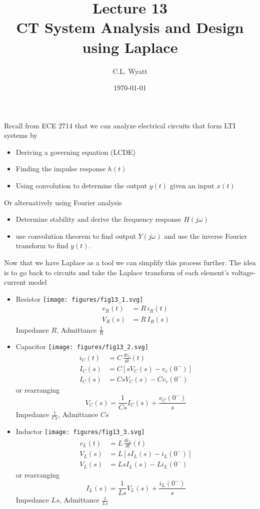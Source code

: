 \documentclass{article}
\begin{document}
\title{Lecture 13\\ CT System Analysis and Design using Laplace}
\author{C.L. Wyatt}
\date{\today}
\maketitle

Recall from ECE 2714 that we can analyze electrical circuits that form LTI systems by

\begin{itemize}
  \item Deriving a governing equation (LCDE)
  \item Finding the impulse response $h(t)$
  \item Using convolution to determine the output $y(t)$ given an input $x(t)$ 
\end{itemize}

Or alternatively using Fourier analysis

\begin{itemize}
  \item Determine stability and derive the frequency response $H(j \omega)$
  \item use convolution theorem to find output $Y(j\omega)$ and use the inverse Fourier transform to find $y(t)$.
\end{itemize}

Now that we have Laplace as a tool we can simplify this process further. The idea is to go back to circuits and take the Laplace transform of each element's voltage-current model

\begin{itemize}
\item Resistor \texttt{[image: figures/fig13\_1.svg]}
  \begin{align*}
    v_R(t) &= R\, i_R(t)\\
    V_R(s) &= R\, I_R(s)
  \end{align*}
  Impedance $R$, Admittance $\frac{1}{R}$
  
\item Capacitor \texttt{[image: figures/fig13\_2.svg]}
    \begin{align*}
    i_C(t) &= C\, \frac{dv_c}{dt}(t)\\
    I_C(s) &= C\left[sV_C(s) - v_c(0^-) \right]\\
    I_C(s) &= CsV_C(s) - Cv_c(0^-)
    \end{align*}
    or rearranging
    \[
    V_C(s) = \frac{1}{Cs}I_C(s) + \frac{v_C(0^-)}{s}
    \]
    Impedance $\frac{1}{Cs}$, Admittance $Cs$
  \item Inductor \texttt{[image: figures/fig13\_3.svg]}
    \begin{align*}
    v_L(t) &= L\, \frac{di_L}{dt}(t)\\
    V_L(s) &= L\left[sI_L(s) - i_L(0^-) \right]\\
    V_L(s) &= LsI_L(s) - Li_L(0^-)
    \end{align*}
    or rearranging
    \[
    I_L(s) = \frac{1}{Ls}V_L(s) + \frac{i_L(0^-)}{s}
    \]
    Impedance $Ls$, Admittance $\frac{1}{Ls}$
\end{itemize}
\end{document}
